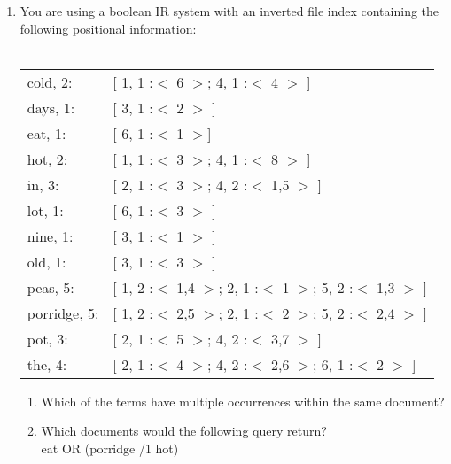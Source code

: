 \documentclass[12pt]{article}
\newcommand{\answer}[1]{\fbox{\parbox{\linewidth}{#1}}}
\begin{document}
	
	\begin{enumerate}[itemsep=3em]
		\item{
			You are using a boolean IR system with an inverted file index containing the following positional information:\\ \\			
				\begin{tabular}{l  l}
					cold, 2:       &  [ 1, 1 :$<$ 6 $>$; 4, 1 :$<$ 4 $>$ ] \\
					days, 1:      &  [ 3, 1 :$<$ 2 $>$ ] \\
					eat, 1:         &  [ 6, 1 :$<$ 1 $>$] \\
					hot, 2:         &  [ 1, 1 :$<$ 3 $>$; 4, 1 :$<$ 8 $>$ ] \\
					in, 3:           &  [ 2, 1 :$<$ 3 $>$; 4, 2 :$<$ 1,5 $>$ ] \\
					lot, 1:          &  [ 6, 1 :$<$ 3 $>$ ] \\
					nine, 1:       &  [ 3, 1 :$<$ 1 $>$ ] \\
					old, 1:         &  [ 3, 1 :$<$ 3 $>$ ] \\
					peas, 5:      &  [ 1, 2 :$<$ 1,4 $>$; 2, 1 :$<$ 1 $>$; 5, 2 :$<$ 1,3 $>$ ] \\
					porridge, 5: &  [ 1, 2 :$<$ 2,5 $>$; 2, 1 :$<$ 2 $>$; 5, 2 :$<$ 2,4 $>$ ] \\
					pot, 3:         &  [ 2, 1 :$<$ 5 $>$; 4, 2 :$<$ 3,7 $>$ ] \\
					the, 4:         &  [ 2, 1 :$<$ 4 $>$; 4, 2 :$<$ 2,6 $>$; 6, 1 :$<$ 2 $>$ ] 
				\end{tabular}
			}
			
			\begin{enumerate}[itemsep=3em]
			\item{
				Which of the terms have multiple occurrences within the same document?
			
				\answer{}
			}
			
			\item{
				Which documents would the following query return? \\ eat OR (porridge /1 hot)
				
				\answer{}
			}
		\end{enumerate}	
		

\end{enumerate}
\end{document}
